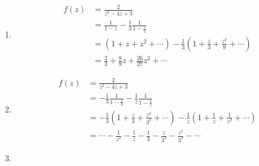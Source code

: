\documentclass{article}
\begin{document}
\setcounter{subsubsection}{18}
\subsubsection{}

\begin{enumerate}
  \item

        \begin{align*}
          f(z) & = \frac{2}{z^2 - 4 z + 3}                                                                      \\
               & = \frac{1}{1 - z} - \frac{1}{3} \frac{1}{1 - \frac{z}{3}}                                      \\
               & = (1 + z + z^2 + \cdots) - \frac{1}{3} \left( 1 + \frac{z}{3} + \frac{z^2}{9} + \cdots \right) \\
               & = \frac{2}{3} + \frac{8}{9} z + \frac{26}{27} z^2 + \cdots
        \end{align*}

  \item

        \begin{align*}
          f(z) & = \frac{2}{z^2 - 4 z + 3}                                                                                                                      \\
               & = -\frac{1}{3} \frac{1}{1 - \frac{z}{3}} - \frac{1}{z} \frac{1}{1 - \frac{1}{z}}                                                               \\
               & = -\frac{1}{3} \left( 1 + \frac{z}{3} + \frac{z^2}{3^2} + \cdots \right) - \frac{1}{z} \left( 1 + \frac{1}{z} + \frac{1}{z^2} + \cdots \right) \\
               & = \cdots - \frac{1}{z^2} - \frac{1}{z} - \frac{1}{3} - \frac{z}{3^2} - \frac{z^2}{3^3} - \cdots
        \end{align*}

  \item


\end{enumerate}
\end{document}
